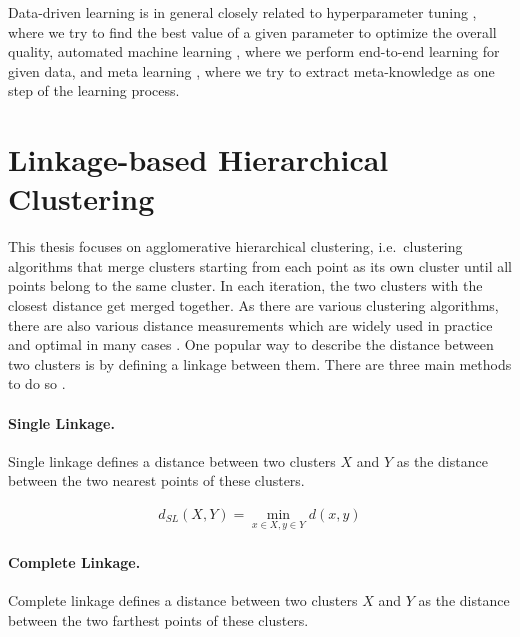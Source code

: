 Data-driven learning is in general closely related to hyperparameter tuning \cite{hutter2015beyond}, where we try to find the best value of a given parameter to optimize the overall quality, automated machine learning \cite{lacoste2014sequential,liu2018very}, where we perform end-to-end learning for given data, and meta learning \cite{alexandros2001model}, where we try to extract meta-knowledge as one step of the learning process.

\section{Linkage-based Hierarchical Clustering}

This thesis focuses on agglomerative hierarchical clustering, i.e.\ clustering algorithms that merge clusters starting from each point as its own cluster until all points belong to the same cluster. In each iteration, the two clusters with the closest distance get merged together. As there are various clustering algorithms, there are also various distance measurements which are widely used in practice and optimal in many cases \cite{awasthi2017local,saeed2003software,white2010alignment,awasthi2012center,balcan2016clustering,grosswendt2017improved}. One popular way to describe the distance between two clusters is by defining a linkage between them. There are three main methods to do so \cite{Manning:2008:IIR:1394399}.

\paragraph{Single Linkage.}

Single linkage defines a distance between two clusters $X$ and $Y$ as the distance between the two nearest points of these clusters.

\begin{equation*}
    \begin{aligned}
        d_{SL}(X,Y) = \min\limits_{x \in X, y \in Y} d(x,y)
    \end{aligned}
    \label{eq:singlelinkage}
\end{equation*}

\paragraph{Complete Linkage.}

Complete linkage defines a distance between two clusters $X$ and $Y$ as the distance between the two farthest points of these clusters.

